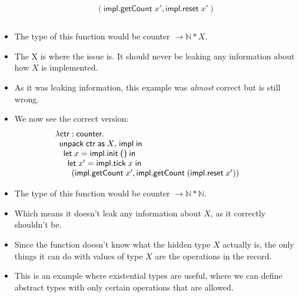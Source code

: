 \documentclass{lecturenotes}
\newcommand{\app}[2]{\ensuremath{#1\;#2}}
\newcommand{\unit}{\ensuremath{\textsf{(}\mkern0.5mu\textsf{)}}}
\begin{document}
\begin{itemize}
$$\begin{array}{l}
\begin{array}{l}
\begin{array}{l}
\begin{array}{l}
          \begin{array}{l}
            (\app{\textsf{impl}.\textsf{getCount}}{x'}, \app{\textsf{impl}.\textsf{reset}}{x'})
          \end{array}
        \end{array}
      \end{array}
    \end{array}
  \end{array}
  $$
\item The type of this function would be \textsf{counter} $\to \mathbb{N} * X$.
\item The X is where the issue is. It should never be leaking any information about how $X$ is implemented.
\item As it was leaking information, this example was \emph{almost} correct but is still wrong. \newline
\item We now see the correct version:
  $$
  \begin{array}{l}
    \lambda \textsf{ctr} \mathrel{:} \textsf{counter}.\\
    \begin{array}{l}
      \textsf{unpack}\mkern5mu\textsf{ctr} \mathrel{\textsf{as}} X,\, \textsf{impl}\;\textsf{in}\\
      \begin{array}{l}
        \textsf{let}\mkern5mux = \app{\textsf{impl}.\textsf{init}}{\unit}\;\textsf{in}\\
        \begin{array}{l}
          \textsf{let}\mkern5mux' = \app{\textsf{impl}.\textsf{tick}}{x}\;\textsf{in}\\
          \begin{array}{l}
            (\app{\textsf{impl}.\textsf{getCount}}{x'}, \app{\textsf{impl}.\textsf{getCount}}{(\app{\textsf{impl}.\textsf{reset}}{x'})})
          \end{array}
        \end{array}
      \end{array}
    \end{array}
  \end{array}
  $$  
\item The type of this function would be \textsf{counter} $\to \mathbb{N} * \mathbb{N}$.
\item Which means it doesn't leak any information about $X$, as it correctly shouldn't be. 
\item Since the function doesn’t know what the hidden type $X$ actually is, the only things it can do with values of type $X$ are the operations in the record.
\item This is an example where existential types are useful, where we can define abstract types with only certain operations that are allowed.
\end{itemize}
\end{document}
